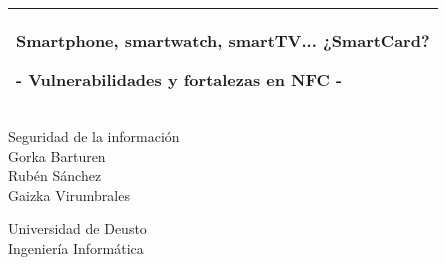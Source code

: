 %
%
%
%
%
\begin{titlepage}
  \addtolength{\hoffset}{0.5\evensidemargin-0.5\oddsidemargin} %
  \noindent%
  \begin{tabular}{@{}p{\textwidth}@{}}
    \toprule[2pt]
    \midrule
    \vspace{0.2cm}
    \begin{center}
    \Huge{\textbf{
      Smartphone, smartwatch, smartTV... ¿SmartCard?%
    }}
    \end{center}
    \begin{center}
      \Large{
        - Vulnerabilidades y fortalezas en NFC -%
      }
    \end{center}
    \vspace{0.2cm}\\
    \midrule
    \toprule[2pt]
  \end{tabular}
  \vspace{4 cm}
  \begin{center}
    {\large
      Seguridad de la información%
    }\\
    \vspace{0.2cm}
    {\Large
      Gorka Barturen \\
      Rubén Sánchez \\
      \vspace{0.2cm} Gaizka Virumbrales%
    }
  \end{center}
  \vfill
  \begin{center}
  Universidad de Deusto\\
  Ingeniería Informática
  \end{center}
\end{titlepage}
\clearpage
